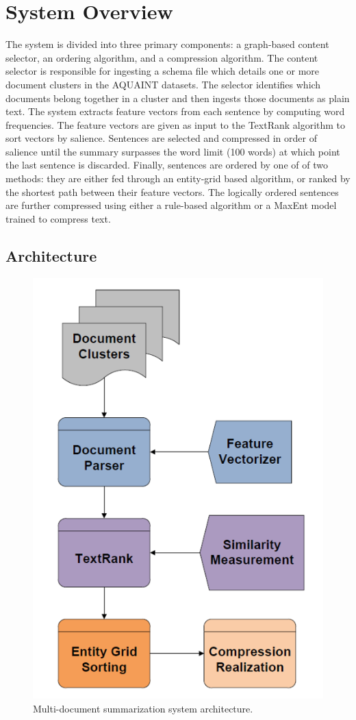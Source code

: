 \documentclass[11pt]{article}
\begin{document}
\section{System Overview}
The system is divided into three primary components: a graph-based content selector, an ordering algorithm, and a compression algorithm. The content selector is responsible for ingesting a schema file which details one or more document clusters in the AQUAINT datasets. The selector identifies which documents belong together in a cluster and then ingests those documents as plain text. The system extracts feature vectors from each sentence by computing word frequencies. The feature vectors are given as input to the  TextRank algorithm to sort vectors by salience. Sentences are selected and compressed in order of salience until the summary surpasses the word limit (100 words) at which point the last sentence is discarded. Finally, sentences are ordered by one of of two methods: they are either fed through an entity-grid based algorithm, or ranked by the shortest path between their feature vectors. The logically ordered sentences are further compressed using either a rule-based algorithm or a MaxEnt model trained to compress text.

\subsection{Architecture}
\begin{figure}
  \includegraphics[width=.9\linewidth,height=.25\textheight,keepaspectratio]{arch_final.png}
  \caption{Multi-document summarization system architecture.}
  \label{fig:arch}
\end{figure}
\end{document}
